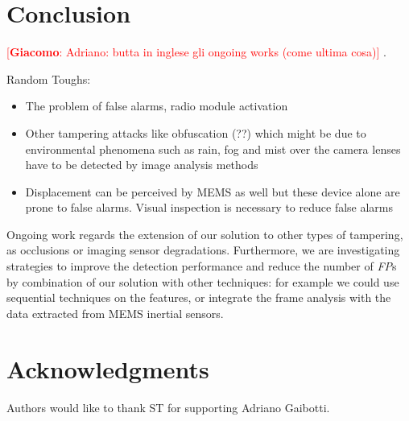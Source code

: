 \documentclass{llncs}
\newcommand{\gi}[1]{{\textcolor{red}{[\small \textbf{Giacomo}: #1]}}}
\begin{document}
\section{Conclusion}\label{sec:Conclusion}
\gi{Adriano: butta in inglese gli ongoing works (come ultima cosa)}
.

Random Toughs:
\begin{itemize}
\item The problem of false alarms, radio module activation
\item Other tampering attacks like obfuscation (??) which might be due to environmental phenomena such as rain, fog and mist over the camera lenses have to be detected by image analysis methods
\item Displacement can be perceived by MEMS as well but these device alone are prone to false alarms. Visual inspection is necessary to reduce false alarms
\end{itemize}
Ongoing work regards the extension of our solution to other types of tampering, as occlusions or imaging sensor degradations.
Furthermore, we are investigating strategies to improve the detection performance and reduce the number of \textit{FP}s by combination of our solution with other techniques:
for example we could use sequential techniques on the features, or integrate the frame analysis with the data extracted from MEMS inertial sensors.   

\section*{Acknowledgments}\label{sec:Acknowledgments}
Authors would like to thank ST for supporting Adriano Gaibotti.




%	
%	
\end{document}
